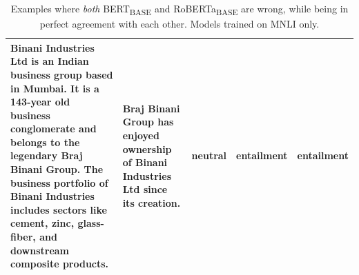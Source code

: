 \begin{table}
\begin{tabular}{p{5cm}p{3cm}lll}
\midrule
{Binani Industries Ltd is an Indian business group based in Mumbai. It is a 143-year old business conglomerate and belongs to the legendary Braj Binani Group. The business portfolio of Binani Industries includes sectors like cement, zinc, glass-fiber, and downstream composite products.}        
& {Braj Binani Group has enjoyed ownership of Binani Industries Ltd since its creation.}           
& {neutral}            
& {entailment}     
& {entailment}        \\

\bottomrule

\end{tabular}
\caption{\label{table:erroranalysis} Examples where \textit{both} BERT\textsubscript{BASE} and RoBERTa\textsubscript{BASE} are wrong, while being in perfect agreement with each other. Models trained on MNLI only.}
\end{table}